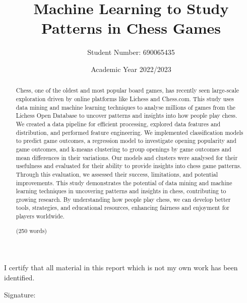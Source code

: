\documentclass[a4paper, 11pt]{article}
\begin{document}
\title{Machine Learning to Study Patterns in Chess Games}
\author{Student Number: 690065435}
\date{Academic Year 2022/2023}

\maketitle

\newpage
\begin{abstract}
Chess, one of the oldest and most popular board games, has recently seen large-scale exploration driven by online platforms like Lichess and Chess.com. This study uses data mining and machine learning techniques to analyse millions of games from the Lichess Open Database to uncover patterns and insights into how people play chess. We created a data pipeline for efficient processing, explored data features and distribution, and performed feature engineering. We implemented classification models to predict game outcomes, a regression model to investigate opening popularity and game outcomes, and k-means clustering to group openings by game outcomes and mean differences in their variations. Our models and clusters were analysed for their usefulness and evaluated for their ability to provide insights into chess game patterns. Through this evaluation, we assessed their success, limitations, and potential improvements. This study demonstrates the potential of data mining and machine learning techniques in uncovering patterns and insights in chess, contributing to growing research. By understanding how people play chess, we can develop better tools, strategies, and educational resources, enhancing fairness and enjoyment for players worldwide.

(250 words)
    
\begin{center}
\end{center}
\end{abstract}

\vspace*{\fill}
\begin{center}

\vspace{1em}
I certify that all material in this report which is not my own work has been identified.
\end{center}
\vspace{1em}

Signature: \hrulefill

\newpage
\tableofcontents
\newpage
\end{document}
